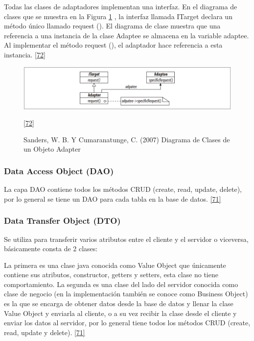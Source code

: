 Todas las clases de adaptadores implementan una interfaz. En el diagrama de clases que se muestra en la Figura \ref{fig:adapter} , la interfaz llamada ITarget declara un método único llamado request (). El diagrama de clase muestra que una referencia a una instancia de la clase Adaptee se almacena en la variable adaptee. Al implementar el método request (), el adaptador hace referencia a esta instancia. \hyperlink{b72}{[72]}

\begin{figure}[H]
	\begin{center}
		\includegraphics[width=1\textwidth]{images/marcoteorico/patrones/adapter}
		\caption{ Sanders, W. B. Y Cumaranatunge, C. (2007) Diagrama de Clases de un Objeto Adapter}
		\hyperlink{b72}{[72]} 
		\label{fig:adapter}
	\end{center}
\end{figure}

\subsubsection{Data Access Object (DAO)}
La capa DAO contiene todos los métodos CRUD (create, read, update, delete), por lo general se tiene un DAO para cada tabla en la base de datos. \hyperlink{b71}{[71]}

\subsubsection{Data Transfer Object (DTO)}
Se utiliza para transferir varios atributos entre el cliente y el servidor o viceversa, básicamente consta de 2 clases:

La primera es una clase java conocida como Value Object que únicamente contiene sus atributos, constructor, getters y setters, esta clase no tiene comportamiento.
La segunda es una clase del lado del servidor conocida como clase de negocio (en la implementación también se conoce como Business Object) es la que se encarga de obtener datos desde la base de datos y llenar la clase Value Object y enviarla al cliente, o a su vez recibir la clase desde el cliente y enviar los datos al servidor, por lo general tiene todos los métodos CRUD (create, read, update y delete). \hyperlink{b71}{[71]}

